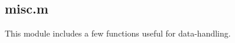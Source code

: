 \documentclass[11pt, twoside,openright]{article}
\begin{document}


\subsection{misc.m}\label{sub.misc.m}

This module includes a few functions useful for data-handling.



\newpage

\printbibliography

\newpage

\printindex

%
%
\end{document}
